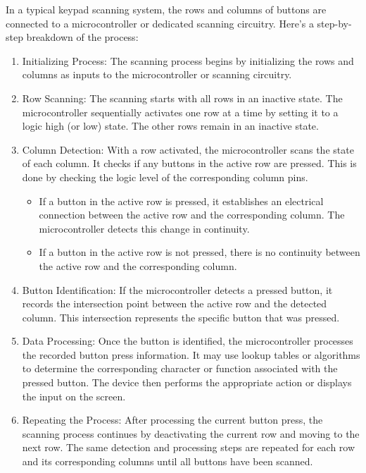 \documentclass[a4paper, twoside]{report}
\begin{document}
In a typical keypad scanning system, the rows and columns of buttons are connected to a microcontroller or dedicated scanning circuitry. Here's a step-by-step breakdown of the process:

\begin{enumerate}
    \item Initializing Process: The scanning process begins by initializing the rows and columns as inputs to the microcontroller or scanning circuitry.
    \item Row Scanning: The scanning starts with all rows in an inactive state. The microcontroller sequentially activates one row at a time by setting it to a logic high (or low) state. The other rows remain in an inactive state.
    \item Column Detection: With a row activated, the microcontroller scans the state of each column. It checks if any buttons in the active row are pressed. This is done by checking the logic level of the corresponding column pins.
    \begin{itemize}
        \item If a button in the active row is pressed, it establishes an electrical connection between the active row and the corresponding column. The microcontroller detects this change in continuity.
        \item If a button in the active row is not pressed, there is no continuity between the active row and the corresponding column.
    \end{itemize}
    \item Button Identification: If the microcontroller detects a pressed button, it records the intersection point between the active row and the detected column. This intersection represents the specific button that was pressed.
    \item Data Processing: Once the button is identified, the microcontroller processes the recorded button press information. It may use lookup tables or algorithms to determine the corresponding character or function associated with the pressed button. The device then performs the appropriate action or displays the input on the screen.
    \item Repeating the Process: After processing the current button press, the scanning process continues by deactivating the current row and moving to the next row. The same detection and processing steps are repeated for each row and its corresponding columns until all buttons have been scanned.
\end{enumerate}
\end{document}

